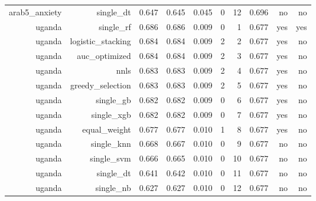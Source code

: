 \documentclass[10pt]{article}
\begin{document}
\begin{longtable}{rrrrrrrrrr}
arab5\_anxiety & single\_dt & 0.647 & 0.645 & 0.045 & 0 & 12 & 0.696 & no & no \\
uganda & single\_rf & 0.686 & 0.686 & 0.009 & 0 & 1 & 0.677 & yes & yes \\
uganda & logistic\_stacking & 0.684 & 0.684 & 0.009 & 2 & 2 & 0.677 & yes & no \\
uganda & auc\_optimized & 0.684 & 0.684 & 0.009 & 2 & 3 & 0.677 & yes & no \\
uganda & nnls & 0.683 & 0.683 & 0.009 & 2 & 4 & 0.677 & yes & no \\
uganda & greedy\_selection & 0.683 & 0.683 & 0.009 & 2 & 5 & 0.677 & yes & no \\
uganda & single\_gb & 0.682 & 0.682 & 0.009 & 0 & 6 & 0.677 & yes & no \\
uganda & single\_xgb & 0.682 & 0.682 & 0.009 & 0 & 7 & 0.677 & yes & no \\
uganda & equal\_weight & 0.677 & 0.677 & 0.010 & 1 & 8 & 0.677 & yes & no \\
uganda & single\_knn & 0.668 & 0.667 & 0.010 & 0 & 9 & 0.677 & no & no \\
uganda & single\_svm & 0.666 & 0.665 & 0.010 & 0 & 10 & 0.677 & no & no \\
uganda & single\_dt & 0.641 & 0.642 & 0.010 & 0 & 11 & 0.677 & no & no \\
uganda & single\_nb & 0.627 & 0.627 & 0.010 & 0 & 12 & 0.677 & no & no \\
\bottomrule
\end{longtable}
\normalsize
\end{document}
